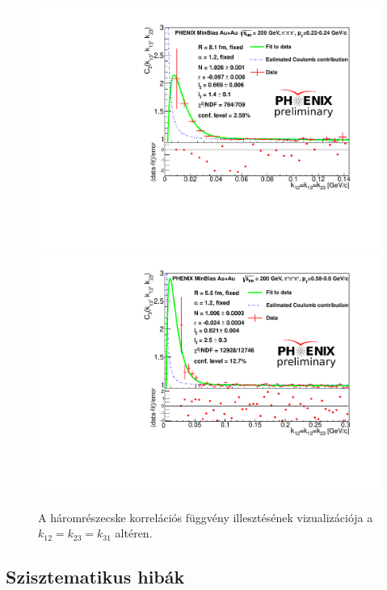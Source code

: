 \documentclass[11pt,a4paper]{article}
\numberwithin{equation}{subsection}
\numberwithin{figure}{section}
\begin{document}
\begin{figure}[H]
\centering
\includegraphics[scale=0.6]{pic/res/diag_lowpt.pdf}
\centering
\includegraphics[scale=0.6]{pic/res/diag_highpt.pdf}
\caption{A háromrészecske korrelációs függvény illesztésének vizualizációja a $k_{12}=k_{23}=k_{31}$ altéren.}
\label{fig:fit}
\end{figure}



\subsection{Szisztematikus hibák}
\end{document}
